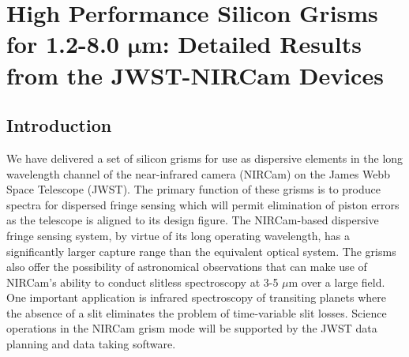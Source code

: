 \newcommand{\bm}[1]{\boldsymbol{#1}}

\chapter{High Performance Silicon Grisms for 1.2-8.0 {\LARGE$\bm{\mu}$}m: Detailed Results from the JWST-NIRCam Devices} 

\section{Introduction}
\label{sec:intro}  %


We have delivered a set of silicon grisms for use as dispersive elements in the long wavelength channel of the near-infrared camera (NIRCam)\cite{Horner04, Greene10} on the James Webb Space Telescope (JWST)\cite{Sabelhaus04}.  The primary function of these grisms is to produce spectra for dispersed fringe sensing which will permit elimination of piston errors as the telescope is aligned to its design figure\cite{Shi08}. The NIRCam-based dispersive fringe sensing system, by virtue of its long operating wavelength, has a significantly larger capture range than the equivalent optical system.  The grisms also offer the possibility of astronomical observations that can make use of NIRCam's ability to conduct slitless spectroscopy at 3-5 $\mu$m over a large field.  One important application is infrared spectroscopy of transiting planets where the absence of a slit eliminates the problem of time-variable slit losses\cite{Greene07}.  Science operations in the NIRCam grism mode will be supported by the JWST data planning and data taking software.

